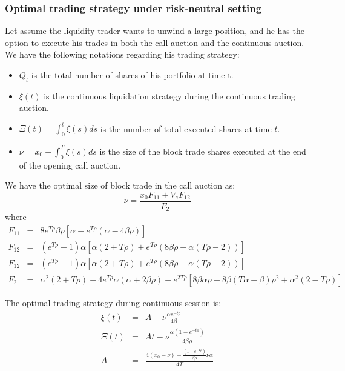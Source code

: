 \subsubsection{Optimal trading strategy under risk-neutral setting}\label{sec:risk_neutral_opt_strat}

Let assume the liquidity trader wants to unwind a large position, and he has the option to execute his trades in both the call auction and the continuous auction. We have the following notations regarding his trading strategy:

\begin{itemize}
  \item $Q_t$ is the total number of shares of his portfolio at time t.
  \item $\xi(t)$ is the continuous liquidation strategy during the continuous trading auction.
  \item $\Xi(t)=\int_0^t \xi(s) ds$ is the number of total executed shares at time $t$.
  \item $\nu=x_0 - \int_0^T \xi(s) ds$ is the size of the block trade shares executed at the end of the opening call auction.
\end{itemize}

\begin{theorem}
  We have the optimal size of block trade in the call auction as:
  \[
    \nu = \frac{x_0 F_{11} + V_e F_{12}}{F_2}
  \]
  where
  \begin{eqnarray*}
    F_{11} &=& 8 e^{T \rho} \beta \rho [\alpha - e^{T \rho} (\alpha - 4 \beta \rho)]\\
    F_{12} &=& (e^{T \rho}-1) \alpha [\alpha (2+T \rho) + e^{T \rho} (8 \beta \rho + \alpha (T \rho - 2 ))]\\
    F_{12} &=& (e^{T \rho}-1) \alpha [\alpha (2+T \rho) + e^{T \rho} (8 \beta \rho + \alpha (T \rho - 2 ))]\\
    F_2 &=& \alpha^2 (2 + T \rho) - 4 e^{T \rho} \alpha (\alpha + 2 \beta \rho) + e^{2 T \rho} [8 \beta \alpha \rho + 8 \beta (T \alpha + \beta) \rho^2 + \alpha^2 (2 - T \rho)]
  \end{eqnarray*}

  The optimal trading strategy during continuous session is:
  \begin{eqnarray*}
    \xi(t) &=& A - \nu \frac{\alpha e^{-t \rho}}{4 \beta}\\
    \Xi(t) &=& A t - \nu \frac{\alpha (1- e^{-t \rho})}{4 \beta \rho}\\
    A &=& \frac{4 (x_0 - \nu) + \frac{(1 - e^{-T \rho})}{\beta \rho} \nu \alpha} {4 T}
  \end{eqnarray*}
\end{theorem}

